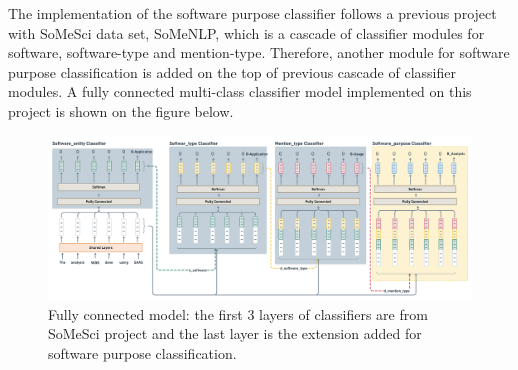 The implementation of the software purpose classifier follows a previous project with SoMeSci data set, SoMeNLP, which is a cascade of classifier modules for software, software-type and mention-type. Therefore, another module for software purpose classification is added on the top of previous cascade of classifier modules. A fully connected multi-class classifier model implemented on this project is  shown on the figure below. 

\begin{figure}[htbp]
	\centering
	\includegraphics[width=1\textwidth]{4.graphics/figures/ch_5/fully_connected_model}
	\caption{Fully connected model: the first 3 layers of classifiers are from \ac{SoMeSci} project and the last layer is the extension added for software purpose classification.}
	\label{fig:chapter05:setup}
\end{figure}

 


